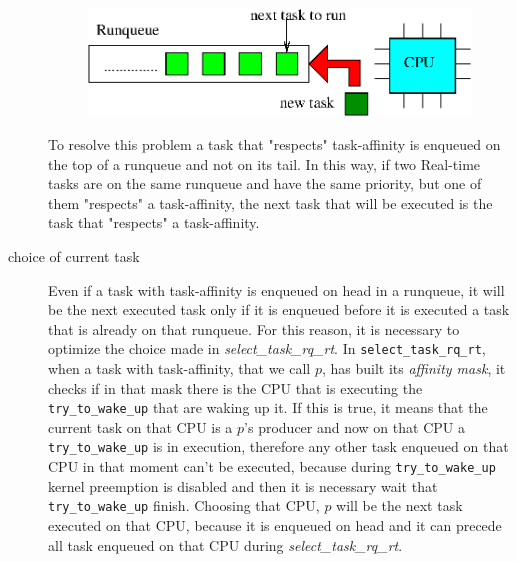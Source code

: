 \begin{description}
\begin{figure}[htbp]
\centering
\includegraphics[width=\widefigure]{images/enq_head.eps}
\caption{}
\label{fig:enq_head}
\end{figure}

To resolve this problem a task that "respects" task-affinity is enqueued on the top of a runqueue and not on its tail. In this way, if two Real-time tasks 
are on the same runqueue and have the same priority, but one of them "respects" a task-affinity, the next task that will be executed is the task that 
"respects" a task-affinity. 

\item[choice of current task] Even if a task with task-affinity is enqueued on head in a runqueue, it will be the next executed task only if it is 
enqueued before it is executed a task that is already on that runqueue. For this reason, it is necessary to optimize the choice made in 
\textit{select\_task\_rq\_rt}. In \texttt{select\_task\_rq\_rt}, when a task with task-affinity, that we call $p$, has built its \textit{affinity mask}, 
it checks if in that mask there is the CPU that is executing the \texttt{try\_to\_wake\_up} that are waking up it. If this is true, it means that the 
current task on that CPU is a $p$'s producer and now on that CPU a \texttt{try\_to\_wake\_up} is in execution, therefore any other task enqueued on that 
CPU in that moment can't be executed, because during \texttt{try\_to\_wake\_up} kernel preemption is disabled and then it is necessary wait that 
\texttt{try\_to\_wake\_up} finish. Choosing that CPU, $p$ will be the next task executed on that CPU, because it is enqueued on head and it can precede 
all task enqueued on that CPU during \textit{select\_task\_rq\_rt}.


\end{description}
